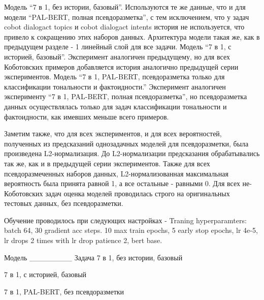Модель “7 в 1, без истории, базовый”. Используются те же данные, что и для модели “PAL-BERT, полная псевдоразметка”, с тем исключением, что у задач cobot dialogact topics и cobot dialogact intents история не используется, что привело к сокращению этих наборов данных. Архитектура модели такая же, как в предыдущем разделе - 1 линейный слой для все задачи.
Модель “7 в 1, с историей, базовый”. Эксперимент аналогичен предыдущему, но для всех Коботовских примеров добавляется история аналогично предыдущей серии экспериментов.
Модель “7 в 1, PAL-BERT, псевдоразметка только для классификации тональности и фактоидности.” Эксперимент аналогичен эксперименту “7 в 1, PAL-BERT, полная псевдоразметка”, но псевдоразметка данных осуществлялась только для задач классификации тональности и фактоидности, как имевших меньше всего примеров.

Заметим также, что для всех экспериментов, и для всех вероятностей, полученных из предсказаний однозадачных моделей для псевдоразметки, была произведена L2-нормализация. До L2-нормализации предсказания обрабатывались так же, как и в предыдущей серии экспериментов. 
Также для всех псевдоразмеченных наборов данных, L2-нормализованная максимальная вероятность была принята равной 1, а все остальные - равными 0.
Для всех не-Коботовских задач оценка моделей проводилась строго на оригинальных тестовых данных, без псевдоразметки.



















Обучение проводилось при следующих настройках - Traning hyperparamters: batch 64, 30 gradient acc steps. 10 max train epochs, 5 early stop epochs, lr 4e-5, lr drops 2 times with lr drop patience 2, bert base.



Модель
________
Задача
7 в 1, без истории, базовый


7 в 1, с историей, базовый



7 в 1, PAL-BERT, без псевдоразметки



